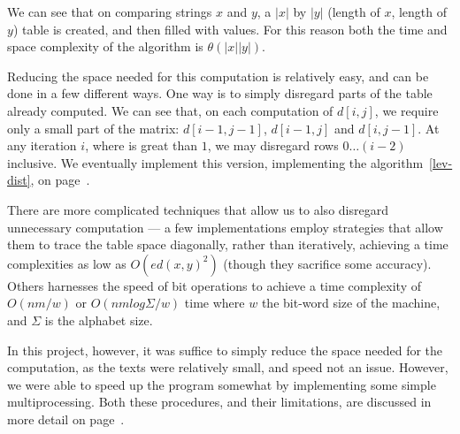 We can see that on comparing strings $x$ and $y$, a $|x|$ by $|y|$
(length of $x$, length of $y$) table is created, and then filled with
values. For this reason both the time and space complexity of the
algorithm is $\theta (|x||y|)$.

Reducing the space needed for this computation is relatively easy, and
can be done in a few different ways. One way is to simply disregard
parts of the table already computed. We can see that, on each
computation of $d[i,j]$, we require only a small part of the matrix:
$d[i-1,j-1]$, $d[i-1,j]$ and $d[i,j-1]$. At any iteration $i$, where
is great than $1$, we may disregard rows $0 \dots (i-2)$ inclusive. We
eventually implement this version, implementing the
algorithm~\ref{lev-dist}, on page~\pageref{lev-dist}.

There are more complicated techniques that allow us to also disregard
unnecessary computation --- a few implementations employ strategies
that allow them to trace the table space diagonally, rather than
iteratively, achieving a time complexities as low as $O(ed(x, y)^2)$
(though they sacrifice some accuracy).\cite{Chang1992} Others
harnesses the speed of bit operations to achieve a time complexity of
$O(nm/w)$ or $O(nm log {\Sigma}/w)$ time where $w$ the bit-word size
of the machine, and $\Sigma$ is the alphabet
size.\cite{Myers1999}\cite{Hyyro2003}

In this project, however, it was suffice to simply reduce the space
needed for the computation, as the texts were relatively small, and
speed not an issue. However, we were able to speed up the program
somewhat by implementing some simple multiprocessing. Both these
procedures, and their limitations, are discussed in more detail on
page~\pageref{multiprocessing-bit}.


